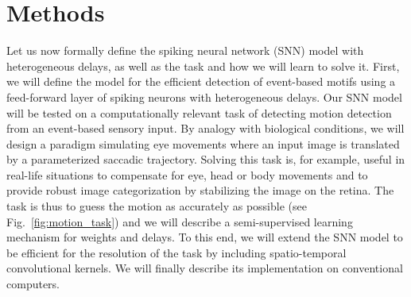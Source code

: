 \documentclass[default]{sn-jnl}%
\theoremstyle{thmstyleone}%
\theoremstyle{thmstyletwo}%
\theoremstyle{thmstylethree}%
\newcommand{\seeFig}[1]{see Fig.~\ref{fig:#1}}%
\begin{document}
\section{Methods}
\label{sec:methods}
Let us now formally define the spiking neural network (SNN) model with heterogeneous delays, as well as the task and how we will learn to solve it. First, we will define the model for the efficient detection of event-based motifs using a feed-forward layer of spiking neurons with heterogeneous delays. Our SNN model will be tested on a computationally relevant task of detecting motion detection from an event-based sensory input. By analogy with biological conditions, we will design a paradigm simulating eye movements where an input image is translated by a parameterized saccadic trajectory. Solving this task is, for example, useful in real-life situations to compensate for eye, head or body movements and to provide robust image categorization by stabilizing the image on the retina. The task is thus to guess the motion as accurately as possible (\seeFig{motion_task}) and we will describe a semi-supervised learning mechanism for weights and delays. To this end, we will extend the SNN model to be efficient for the resolution of the task by including spatio-temporal convolutional kernels. We will finally describe its implementation on conventional computers. 
%
\end{document}
